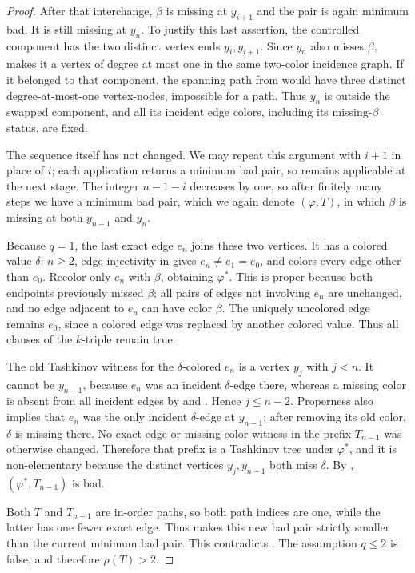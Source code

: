 \begin{proof}
After that interchange, \(\beta\) is missing at \(y_{i+1}\) and the pair
is again minimum bad.  It is still missing at \(y_n\).  To justify this
last assertion, the controlled component has the two distinct vertex ends
\(y_i,y_{i+1}\).  Since \(y_n\) also misses \(\beta\),
 makes it a vertex of degree at
most one in the same two-color incidence graph.  If it belonged to that
component, the spanning path from
 would have three distinct
degree-at-most-one vertex-nodes, impossible for a path.  Thus \(y_n\) is
outside the swapped component, and all its incident edge colors, including
its missing-\(\beta\) status, are fixed.

The sequence itself has not changed.  We may repeat this argument with
\(i+1\) in place of \(i\); each application returns a minimum bad pair,
so  remains applicable at the next
stage.  The integer \(n-1-i\) decreases by one, so after finitely many
steps we have a minimum bad pair, which we again denote
\((\varphi,T)\), in which \(\beta\) is missing at both
\(y_{n-1}\) and \(y_n\).

Because \(q=1\), the last exact edge \(e_n\) joins these two vertices.
It has a colored value \(\delta\): \(n\ge2\), edge injectivity in
 gives \(e_n\ne e_1=e_0\), and
 colors every edge other than \(e_0\).
Recolor only \(e_n\) with \(\beta\), obtaining \(\varphi^*\).  This is
proper because both endpoints previously missed \(\beta\); all pairs of
edges not involving \(e_n\) are unchanged, and no edge adjacent to
\(e_n\) can have color \(\beta\).  The uniquely uncolored edge remains
\(e_0\), since a colored edge was replaced by another colored value.
Thus all clauses of the \(k\)-triple remain true.

The old Tashkinov witness for the \(\delta\)-colored \(e_n\) is a vertex
\(y_j\) with \(j<n\).  It cannot be \(y_{n-1}\), because \(e_n\) was an
incident \(\delta\)-edge there, whereas a missing color is absent from all
incident edges by  and .
Hence \(j\le n-2\).  Properness also implies that \(e_n\) was the only
incident \(\delta\)-edge at \(y_{n-1}\); after removing its old color,
\(\delta\) is missing there.  No exact edge or missing-color witness in
the prefix \(T_{n-1}\) was otherwise changed.  Therefore that prefix is a
Tashkinov tree under \(\varphi^*\), and it is non-elementary because the
distinct vertices \(y_j,y_{n-1}\) both miss \(\delta\).
By , \((\varphi^*,T_{n-1})\) is bad.

Both \(T\) and \(T_{n-1}\) are in-order paths, so both path indices are
one, while the latter has one fewer exact edge.  Thus
 makes this new bad pair strictly smaller than
the current minimum bad pair.  This contradicts
.  The assumption \(q\le2\) is false, and
therefore \(\rho(T)>2\).
\end{proof}
